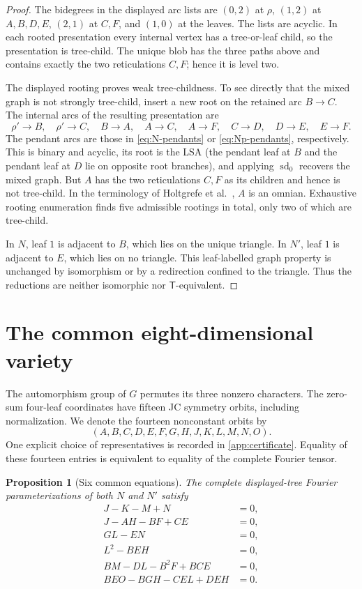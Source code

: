 \documentclass[11pt]{article}
\newtheorem{proposition}[theorem]{Proposition}
\theoremstyle{remark}
\newcommand{\Tmove}{\mathsf T}
\begin{document}
\begin{proof}
The bidegrees in the displayed arc lists are $(0,2)$ at $\rho$, $(1,2)$ at
$A,B,D,E$, $(2,1)$ at $C,F$, and $(1,0)$ at the leaves.  The lists are
acyclic.  In each rooted presentation every internal vertex has a
tree-or-leaf child, so the presentation is tree-child.  The unique blob has
the three paths above and contains exactly the two reticulations $C,F$;
hence it is level two.

The displayed rooting proves weak tree-childness.  To see directly that the
mixed graph is not strongly tree-child, insert a new root on the retained arc
$B\to C$.  The internal arcs of the resulting presentation are
\[
\rho'\to B,\quad \rho'\to C,\quad B\to A,\quad A\to C,
\quad A\to F,\quad C\to D,\quad D\to E,\quad E\to F.
\]
The pendant arcs are those in \eqref{eq:N-pendants} or
\eqref{eq:Np-pendants}, respectively.  This is binary and acyclic, its root
is the LSA (the pendant leaf at $B$ and the pendant leaf at $D$ lie on
opposite root branches), and applying $\operatorname{sd}_0$ recovers the
mixed graph.  But $A$ has the two reticulations $C,F$ as its children and
hence is not tree-child.  In the terminology of Holtgrefe et
al.~\cite{HoltgrefeEtAl2026}, $A$ is an omnian.  Exhaustive rooting
enumeration finds five admissible rootings in total, only two of which are
tree-child.

In $N$, leaf $1$ is adjacent to $B$, which lies on the unique triangle.  In
$N'$, leaf $1$ is adjacent to $E$, which lies on no triangle.  This
leaf-labelled graph property is unchanged by isomorphism or by a redirection
confined to the triangle.  Thus the reductions are neither isomorphic nor
$\Tmove$-equivalent.
\end{proof}

\section{The common eight-dimensional variety}

The automorphism group of $G$ permutes its three nonzero characters.  The
zero-sum four-leaf coordinates have fifteen JC symmetry orbits, including
normalization.  We denote the fourteen nonconstant orbits by
\[
(A,B,C,D,E,F,G,H,J,K,L,M,N,O).
\]
One explicit choice of representatives is recorded in
\cref{app:certificate}.  Equality of these fourteen entries is equivalent to
equality of the complete Fourier tensor.

\begin{proposition}[Six common equations]\label{prop:invariants}
The complete displayed-tree Fourier parameterizations of both $N$ and $N'$
satisfy
\begin{align}
J-K-M+N&=0,\label{inv:1}\\
J-AH-BF+CE&=0,\label{inv:2}\\
GL-EN&=0,\label{inv:3}\\
L^2-BEH&=0,\label{inv:4}\\
BM-DL-B^2F+BCE&=0,\label{inv:5}\\
BEO-BGH-CEL+DEH&=0.\label{inv:6}
\end{align}
\end{proposition}
\end{document}
